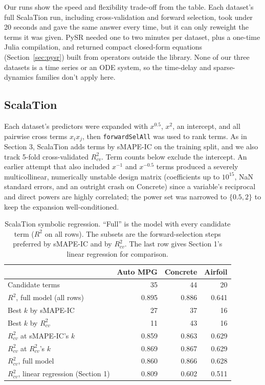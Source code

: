 \documentclass[11pt]{article}
\begin{document}
Our runs show the speed and flexibility trade-off from the table. Each
dataset's full ScalaTion run, including cross-validation and forward
selection, took under 20 seconds and gave the same answer every time, but it
can only reweight the terms it was given. PySR needed one to two minutes per
dataset, plus a one-time Julia compilation, and returned compact closed-form
equations (Section~\ref{sec:pysr}) built from operators outside the library.
None of our three datasets is a time series or an ODE system, so the
time-delay and sparse-dynamics families don't apply here.

\subsection{ScalaTion}
Each dataset's predictors were expanded with $x^{0.5}$, $x^{2}$, an
intercept, and all pairwise cross terms $x_ix_j$, then \texttt{forwardSelAll}
was used to rank terms. As in Section 3, ScalaTion adds terms by sMAPE-IC on
the training split, and we also track 5-fold cross-validated $R^2_{cv}$.
Term counts below exclude the intercept. An earlier attempt that also included $x^{-1}$
and $x^{-0.5}$ terms produced a severely multicollinear, numerically unstable
design matrix (coefficients up to $10^{15}$, NaN standard errors, and an
outright crash on Concrete) since a variable's reciprocal and direct powers
are highly correlated; the power set was narrowed to $\{0.5,2\}$ to keep the
expansion well-conditioned.

\begin{table}[H]
\centering
\caption{ScalaTion symbolic regression. ``Full'' is the model with every
candidate term ($R^2$ on all rows). The subsets are the forward-selection
steps preferred by sMAPE-IC and by $R^2_{cv}$. The last row gives Section 1's
linear regression for comparison.}
\label{tab:symbolic}
\begin{tabular}{lrrr}
\toprule
 & Auto MPG & Concrete & Airfoil \\
\midrule
Candidate terms &35 & 44 & 20 \\
$R^2$, full model (all rows) &0.895 & 0.886 & 0.641 \\
\midrule
Best $k$ by sMAPE-IC &27 & 37 & 16 \\
Best $k$ by $R^2_{cv}$ &11 & 43 & 16 \\
\midrule
$R^2_{cv}$ at sMAPE-IC's $k$ &0.859 & 0.863 & 0.629 \\
$R^2_{cv}$ at $R^2_{cv}$'s $k$ &0.869 & 0.867 & 0.629 \\
$R^2_{cv}$, full model &0.860 & 0.866 & 0.628 \\
\midrule
$R^2_{cv}$, linear regression (Section 1) &0.809 & 0.602 & 0.511 \\
\bottomrule
\end{tabular}
\end{table}
\end{document}
